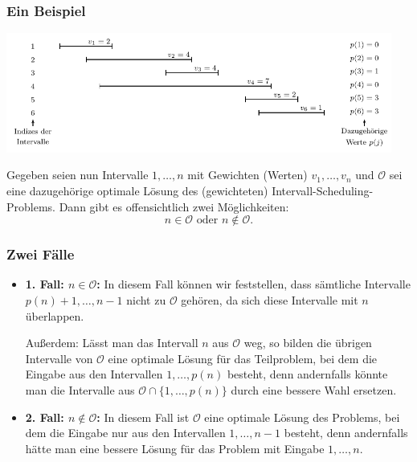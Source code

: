\documentclass[smaller]{beamer}
\renewcommand{\O}{\mathcal{O}}
\begin{document}
\begin{frame}
 \frametitle{Ein Beispiel}
 
\begin{center}
 \includegraphics[width=0.95\textwidth]{fig88.pdf}
\end{center}

Gegeben seien nun Intervalle $1,\ldots,n$ mit Gewichten (Werten) $v_1,\ldots,v_n$ und \alert{$\O$ sei eine dazugehörige optimale Lösung des (gewichteten) Intervall-Scheduling-Problems.} Dann gibt es offensichtlich zwei Mög\-lich\-kei\-ten: 
\begin{equation*}
n \in \O \text{ oder } n \notin \O.
\end{equation*}
\end{frame}

\begin{frame}
\frametitle{Zwei Fälle}
\begin{itemize}
\item \textbf{1. Fall: $n \in \mathcal{O}$:}
In diesem Fall können wir feststellen, dass sämtliche Intervalle $p(n)+1,\ldots,n-1$ nicht zu $\O$ gehören, da sich diese Intervalle mit $n$ überlappen. \\ \medskip

\alert{Außerdem}: Lässt man das Intervall $n$ aus $\O$ weg, so bilden die übrigen Intervalle von $\O$ eine optimale Lösung für das Teilproblem, bei dem die Eingabe aus den Intervallen $1,\ldots,p(n)$ besteht, denn andernfalls könnte man die Intervalle aus $\O \cap \bigl\{ 1,\ldots,p(n) \bigr\}$ durch eine bessere Wahl ersetzen.

\item \textbf{2. Fall: $n \notin \O$:}
In diesem Fall ist $\O$ eine optimale Lösung des Problems, bei dem die Eingabe nur aus den Intervallen $1,\ldots,n-1$ besteht, denn andernfalls hätte man eine bessere Lösung für das Problem mit Eingabe $1,\ldots,n$.
\end{itemize}
\end{frame}
\end{document}
